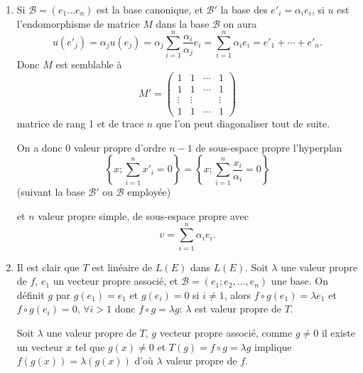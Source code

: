 \begin{enumerate}[label=\arabic*.,leftmargin=2.2em,itemsep=1.1em]
Si tous les $a_i$ sont nuls $A$ est l'homothétie $bI_n$.

Si $\sum_{i=1}^n a_i^2\ne0$, (on est sur $\mathbb R$), $B$ de rang 1 admet 0 pour valeur propre d'ordre $n-1$, de sous-espace propre l'hyperplan d'équation
\[
a_1x_1+\cdots+a_nx_n=0;
\]
et $\sum_{i=1}^n a_i^2=\operatorname{trace}(B)$, valeur propre simple, de vecteur propre $\sum_{i=1}^n a_i e_i$ avec $(e_1\ldots e_n)$ base canonique.

D'où pour $A$, $b$ valeur propre d'ordre $n-1$, vecteurs propres les $a_i e_{i_0}-a_{i_0}e_i$, (si, $a_{i_0}\ne0$), pour $i\in\{1,\ldots,n\}-\{i_0\}$; et $b+\sum_{i=1}^n a_i^2$ valeur propre simple, de vecteur propre $\sum_{i=1}^n a_i e_i$.

\item Si $\mathcal B=(e_1\ldots e_n)$ est la base canonique, et $\mathcal B'$ la base des $e'_i=\alpha_i e_i$, si $u$ est l'endomorphisme de matrice $M$ dans la base $\mathcal B$ on aura
\[
u(e'_j)=\alpha_j u(e_j)=\alpha_j\sum_{i=1}^n\frac{\alpha_i}{\alpha_j}e_i
=\sum_{i=1}^n\alpha_i e_i=e'_1+\cdots+e'_n.
\]
Donc $M$ est semblable à
\[
M'=\begin{pmatrix}
1&1&\cdots&1\\
1&1&\cdots&1\\
\vdots&\vdots&&\vdots\\
1&1&\cdots&1
\end{pmatrix}
\]
matrice de rang 1 et de trace $n$ que l'on peut diagonaliser tout de suite.

On a donc 0 valeur propre d'ordre $n-1$ de sous-espace propre l'hyperplan
\[
\left\{x;\sum_{i=1}^n x'_i=0\right\}
=\left\{x;\sum_{i=1}^n\frac{x_i}{\alpha_i}=0\right\}
\]
(suivant la base $\mathcal B'$ ou $\mathcal B$ employée)

et $n$ valeur propre simple, de sous-espace propre  avec
\[
v=\sum_{i=1}^n\alpha_i e_i.
\]

\item Il est clair que $T$ est linéaire de $L(E)$ dans $L(E)$.
Soit $\lambda$ une valeur propre de $f$, $e_1$ un vecteur propre associé, et $\mathcal B=(e_1;e_2,\ldots,e_n)$ une base. On définit $g$ par $g(e_1)=e_1$ et $g(e_i)=0$ si $i\ne1$, alors $f\circ g(e_1)=\lambda e_1$ et $f\circ g(e_i)=0$, $\forall i>1$ donc $f\circ g=\lambda g$: $\lambda$ est valeur propre de $T$.

Soit $\lambda$ une valeur propre de $T$, $g$ vecteur propre associé, comme $g\ne0$ il existe un vecteur $x$ tel que $g(x)\ne0$ et $T(g)=f\circ g=\lambda g$ implique $f(g(x))=\lambda(g(x))$ d'où $\lambda$ valeur propre de $f$.


\end{enumerate}
